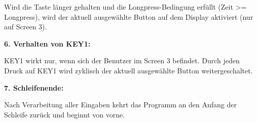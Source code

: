 \begin{inhalt}
Wird die Taste länger gehalten und die Longpress-Bedingung erfüllt (Zeit >= Longpress), wird der aktuell ausgewählte Button auf dem Display aktiviert (nur auf Screen 3).

\textbf{6. Verhalten von KEY1:}

KEY1 wirkt nur, wenn sich der Benutzer im Screen 3 befindet. Durch jeden Druck auf KEY1 wird zyklisch der aktuell ausgewählte Button weitergeschaltet.

\textbf{7. Schleifenende:}

Nach Verarbeitung aller Eingaben kehrt das Programm an den Anfang der Schleife zurück und beginnt von vorne.






\end{inhalt}
